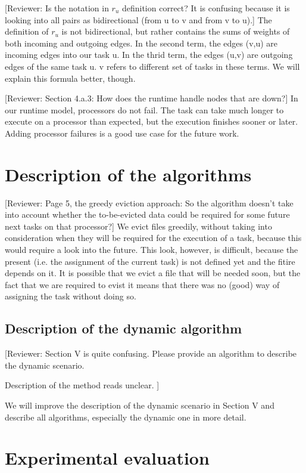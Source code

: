 \documentclass{article}
\newcommand{\review}[1]{{\color{orange}[Reviewer: #1]}}
\begin{document}
    \review{Is the notation in $r_u$ definition correct? It is confusing because  it is looking into all pairs as
    bidirectional (from u to v and from v to  u).}
    The definition of $r_u$ is not bidirectional, but rather contains the sums of weights of both incoming and outgoing edges.
    In the second term, the edges (v,u) are incoming edges into our task u.
    In the thrid term, the edges (u,v) are outgoing edges of the same task u.
    v refers to different set of tasks in these terms.
    We will explain this formula better, though.

    \review{Section 4.a.3: How does the runtime handle nodes that are down?}
    In our runtime model, processors do not fail.
    The task can take much longer to execute on a processor than expected, but the execution finishes sooner or later.
    Adding processor failures is a good use case for the future work.


    \section{Description of the algorithms}

    \review{Page 5, the greedy eviction approach: So the algorithm doesn't take into account whether the to-be-evicted
    data could be required for some future next tasks on that processor?}
    We evict files greedily, without taking into consideration when they will be required for the execution of a task,
    because this would require a look into the future.
    This look, however, is difficult, because the present (i.e. the assignment of the current task) is not defined yet
    and the fitire depends on it.
    It is possible that we evict a file that will be needed soon, but the fact that we are required to evist it means that
    there was no (good) way of assigning the task without doing so.


    \subsection{Description of the dynamic algorithm}
    \review{Section V is quite confusing. Please provide an algorithm to describe the dynamic scenario.

    Description of the method reads unclear.
    }

    We will improve the description of the dynamic scenario in Section V and describe all algorithms, especially the dynamic one
    in more detail.


    \section{Experimental evaluation}
\end{document}
